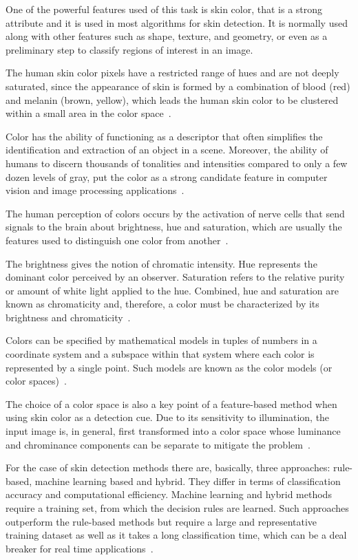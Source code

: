 One of the powerful features used of this task is skin color, that is a strong attribute and it is used in most algorithms for skin detection. It is normally used along with other features such as shape, texture, and geometry, or even as a preliminary step to classify regions of interest in an image.

The human skin color pixels have a restricted range of hues and are not deeply saturated, since the appearance of skin is formed by a combination of blood (red) and melanin (brown, yellow), which leads the human skin color to be clustered within a small area in the color space~\citep{fleck:96}.

Color has the ability of functioning as a descriptor that often simplifies the identification and extraction of an object in a scene. Moreover, the ability of humans to discern thousands of tonalities and intensities compared to only a few dozen levels of gray, put the color as a strong candidate feature in computer vision and image processing applications~\citep{gonzalez:02}.

The human perception of colors occurs by the activation of nerve cells that send signals to the brain about brightness, hue and saturation, which are usually the features used to distinguish one color from another~\citep{gonzalez:02}.

The brightness gives the notion of chromatic intensity. Hue represents the dominant color perceived by an observer. Saturation refers to the relative purity or amount of white light applied to the hue. Combined, hue and saturation are known as chromaticity and, therefore, a color must be characterized by its brightness and chromaticity~\citep{gonzalez:02}.

Colors can be specified by mathematical models in tuples of numbers in a coordinate system and a subspace within that system where each color is represented by a single point. Such models are known as the color models (or color spaces)~\citep{gonzalez:02}.

The choice of a color space is also a key point of a feature-based method when using skin color as a detection cue. Due to its sensitivity to illumination, the input image is, in general, first transformed into a color space whose luminance and chrominance components can be separate to mitigate the problem~\citep{vezhnevets:03}.

For the case of skin detection methods there are, basically, three approaches: rule-based, machine learning based and hybrid. They differ in terms of classification accuracy and computational efficiency. Machine learning and hybrid methods require a training set, from which the decision rules are learned. Such approaches outperform the rule-based methods but require a large and representative training dataset as well as it takes a long classification time, which can be a deal breaker for real time applications~\citep{kakumanu:07}.

